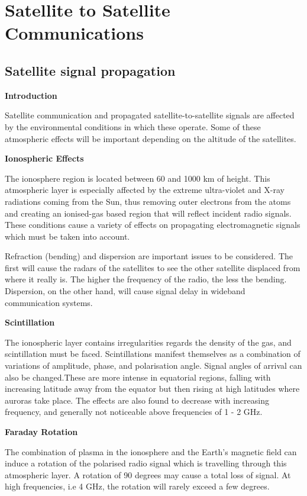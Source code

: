 \section{Satellite to Satellite Communications}


\subsection{Satellite signal propagation}

\textbf{Introduction}\newline

Satellite communication and propagated satellite-to-satellite signals are affected by the environmental conditions in which these operate. Some of these atmospheric effects will be important depending on the altitude of the satellites. \newline

\textbf{Ionospheric Effects}\newline

The ionosphere region is located between 60 and 1000 km of height. This atmospheric layer is especially affected by the extreme ultra-violet and X-ray radiations coming from the Sun, thus removing outer electrons from the atoms and creating an ionised-gas based region that will reflect incident radio signals. These conditions cause a variety of effects on propagating electromagnetic signals which must be taken into account. \newline

Refraction (bending) and dispersion are important issues to be considered. The first will cause the radars of the satellites to see the other satellite displaced from where it really is. The higher the frequency of the radio, the less the bending. Dispersion, on the other hand, will cause signal delay in wideband communication systems. \newline

\textbf{Scintillation}\newline

The ionospheric layer contains irregularities regards the density of the gas, and scintillation must be faced. Scintillations manifest themselves as a combination of variations of amplitude, phase, and polarisation angle. Signal angles of arrival can also be changed.These are more intense in equatorial regions, falling with increasing latitude away from the equator but then rising at high latitudes where auroras take place. The effects are also found to decrease with increasing frequency, and generally not noticeable above frequencies of 1 - 2 GHz.\newline

\textbf{Faraday Rotation}\newline

The combination of plasma in the ionosphere and the Earth's magnetic field can induce a rotation of the polarised radio signal which is travelling through this atmospheric layer. A rotation of 90 degrees may cause a total loss of signal. At high frequencies, i.e 4 GHz, the rotation will rarely exceed a few degrees.